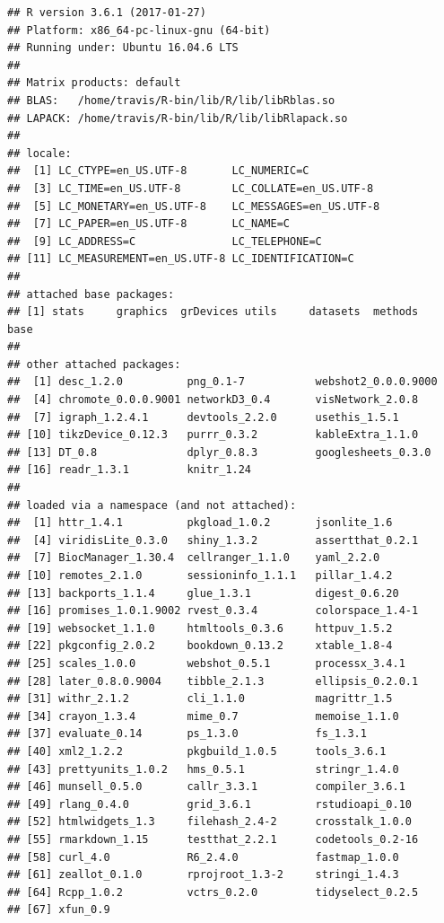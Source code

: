 \documentclass[]{article}
\begin{document}
\begin{verbatim}
## R version 3.6.1 (2017-01-27)
## Platform: x86_64-pc-linux-gnu (64-bit)
## Running under: Ubuntu 16.04.6 LTS
## 
## Matrix products: default
## BLAS:   /home/travis/R-bin/lib/R/lib/libRblas.so
## LAPACK: /home/travis/R-bin/lib/R/lib/libRlapack.so
## 
## locale:
##  [1] LC_CTYPE=en_US.UTF-8       LC_NUMERIC=C              
##  [3] LC_TIME=en_US.UTF-8        LC_COLLATE=en_US.UTF-8    
##  [5] LC_MONETARY=en_US.UTF-8    LC_MESSAGES=en_US.UTF-8   
##  [7] LC_PAPER=en_US.UTF-8       LC_NAME=C                 
##  [9] LC_ADDRESS=C               LC_TELEPHONE=C            
## [11] LC_MEASUREMENT=en_US.UTF-8 LC_IDENTIFICATION=C       
## 
## attached base packages:
## [1] stats     graphics  grDevices utils     datasets  methods   base     
## 
## other attached packages:
##  [1] desc_1.2.0          png_0.1-7           webshot2_0.0.0.9000
##  [4] chromote_0.0.0.9001 networkD3_0.4       visNetwork_2.0.8   
##  [7] igraph_1.2.4.1      devtools_2.2.0      usethis_1.5.1      
## [10] tikzDevice_0.12.3   purrr_0.3.2         kableExtra_1.1.0   
## [13] DT_0.8              dplyr_0.8.3         googlesheets_0.3.0 
## [16] readr_1.3.1         knitr_1.24         
## 
## loaded via a namespace (and not attached):
##  [1] httr_1.4.1          pkgload_1.0.2       jsonlite_1.6       
##  [4] viridisLite_0.3.0   shiny_1.3.2         assertthat_0.2.1   
##  [7] BiocManager_1.30.4  cellranger_1.1.0    yaml_2.2.0         
## [10] remotes_2.1.0       sessioninfo_1.1.1   pillar_1.4.2       
## [13] backports_1.1.4     glue_1.3.1          digest_0.6.20      
## [16] promises_1.0.1.9002 rvest_0.3.4         colorspace_1.4-1   
## [19] websocket_1.1.0     htmltools_0.3.6     httpuv_1.5.2       
## [22] pkgconfig_2.0.2     bookdown_0.13.2     xtable_1.8-4       
## [25] scales_1.0.0        webshot_0.5.1       processx_3.4.1     
## [28] later_0.8.0.9004    tibble_2.1.3        ellipsis_0.2.0.1   
## [31] withr_2.1.2         cli_1.1.0           magrittr_1.5       
## [34] crayon_1.3.4        mime_0.7            memoise_1.1.0      
## [37] evaluate_0.14       ps_1.3.0            fs_1.3.1           
## [40] xml2_1.2.2          pkgbuild_1.0.5      tools_3.6.1        
## [43] prettyunits_1.0.2   hms_0.5.1           stringr_1.4.0      
## [46] munsell_0.5.0       callr_3.3.1         compiler_3.6.1     
## [49] rlang_0.4.0         grid_3.6.1          rstudioapi_0.10    
## [52] htmlwidgets_1.3     filehash_2.4-2      crosstalk_1.0.0    
## [55] rmarkdown_1.15      testthat_2.2.1      codetools_0.2-16   
## [58] curl_4.0            R6_2.4.0            fastmap_1.0.0      
## [61] zeallot_0.1.0       rprojroot_1.3-2     stringi_1.4.3      
## [64] Rcpp_1.0.2          vctrs_0.2.0         tidyselect_0.2.5   
## [67] xfun_0.9
\end{verbatim}
\end{document}
